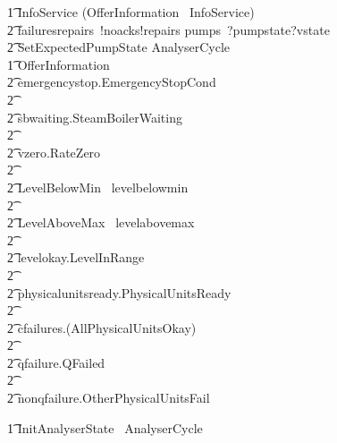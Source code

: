 \documentclass{report} %
\begin{document}
\begin{circusaction}
    \t1 InfoService \circdef (OfferInformation \circseq\ InfoService) \extchoice \\
            \t2 failuresrepairs~!noacks!repairs \then pumps~?pumpstate?vstate \then \\
            \t2 \lschexpract SetExpectedPumpState \rschexpract \circseq AnalyserCycle \\ %
    \t1 OfferInformation \circdef \\
            \t2 emergencystop.EmergencyStopCond \then \Skip \\ \t2 \extchoice \\ %
            \t2 sbwaiting.SteamBoilerWaiting \then \Skip \\ \t2 \extchoice \\
            \t2 vzero.RateZero \then \Skip \\ \t2 \extchoice \\ %
            \t2 \lcircguard LevelBelowMin \rcircguard \circguard\ levelbelowmin \then \Skip \\ \t2 \extchoice \\
            \t2 \lcircguard LevelAboveMax \rcircguard \circguard\ levelabovemax \then \Skip \\ \t2 \extchoice \\ %
            \t2 levelokay.LevelInRange \then \Skip \\ \t2 \extchoice \\ %
            \t2 physicalunitsready.PhysicalUnitsReady \then \Skip \\ \t2 \extchoice  \\ %
            \t2 cfailures.(\lnot AllPhysicalUnitsOkay) \then \Skip \\ \t2 \extchoice \\
            \t2 qfailure.QFailed \then \Skip \\ \t2 \extchoice \\ %
            \t2 nonqfailure.OtherPhysicalUnitsFail \then \Skip \\
\end{circusaction}
\begin{circusaction}
    \t1 \circspot \lschexpract InitAnalyserState \rschexpract \circseq\ AnalyserCycle \\
\end{circusaction}
\begin{circus}
    \circend
\end{circus}
\end{document}

